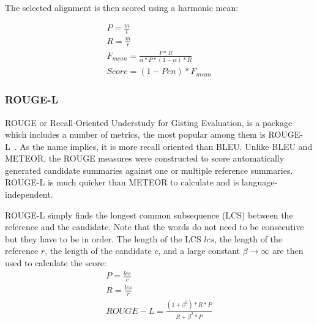 The selected alignment is then scored using a harmonic mean:

\begin{equation}
  \begin{aligned}
P = \frac{m}{t} \\
R = \frac{m}{r} \\
F_{mean} = \frac{P*R}{\alpha * P * (1 - \alpha) * R} \\
\mathit{Score} = (1 - \mathit{Pen}) * F_{\mathit{mean}}
\end{aligned}
\end{equation}

\subsubsection{ROUGE-L}
ROUGE or Recall-Oriented Understudy for Gisting Evaluation, is a package which includes a number of metrics, the most popular among them is ROUGE-L~\cite{Rouge}. As the name implies, it is more recall oriented than BLEU. Unlike BLEU and METEOR, the ROUGE measures were constructed to score automatically generated candidate summaries against one or multiple reference summaries. ROUGE-L is much quicker than METEOR to calculate and is language-independent. 

ROUGE-L simply finds the longest common subsequence (LCS) between the reference and the candidate. Note that the words do not need to be consecutive but they have to be in order. The length of the LCS \(\mathit{lcs}\), the length of the reference \(r\), the length of the candidate \(c\), and a large constant \(\beta \rightarrow \infty\) are then used to calculate the score:
\begin{equation}
  \begin{aligned}
P = \frac{\mathit{lcs}}{c} \\
R = \frac{\mathit{lcs}}{r} \\
\mathit{ROUGE-L}= \frac{(1+\beta^2)*R*P}{R+ \beta^2 * P} \\
\end{aligned}
\end{equation}


